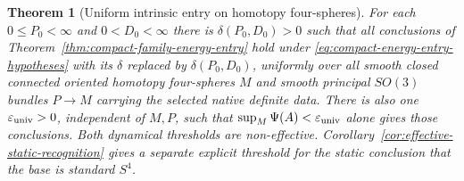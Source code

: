 \documentclass[11pt]{article}
\numberwithin{equation}{section}
\newtheorem{theorem}{Theorem}[section]
\theoremstyle{definition}
\theoremstyle{remark}
\begin{document}
\begin{theorem}[Uniform intrinsic entry on homotopy four-spheres]
\label{thm:uniform-intrinsic-entry}
For each $0\le P_0<\infty$ and $0<D_0<\infty$ there is
$\delta(P_0,D_0)>0$ such that all conclusions of
Theorem~\ref{thm:compact-family-energy-entry} hold under
\eqref{eq:compact-energy-entry-hypotheses} with its $\delta$
replaced by $\delta(P_0,D_0)$, uniformly over
all smooth closed connected oriented homotopy four-spheres
$M$ and smooth principal $SO(3)$ bundles $P\to M$ carrying
the selected native definite data. There is also one
$\varepsilon_{\rm univ}>0$, independent of $M,P$, such that
$\sup_M\Psi(A)<\varepsilon_{\rm univ}$ alone gives those
conclusions. Both dynamical thresholds are non-effective.
Corollary~\ref{cor:effective-static-recognition} gives a separate explicit
threshold for the static conclusion that the base is standard $S^4$.
\end{theorem}
\end{document}
